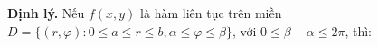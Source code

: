 \documentclass[preview]{standalone}
\begin{document}
\begin{center}
\textbf{Định lý.} Nếu $f(x, y)$ là hàm liên tục trên miền $D = \{(r, \varphi): 0 \leq a \leq r \leq b, \alpha \leq \varphi \leq \beta\}$, với $0 \leq \beta - \alpha \leq 2\pi$, thì:
\end{center}
\end{document}
